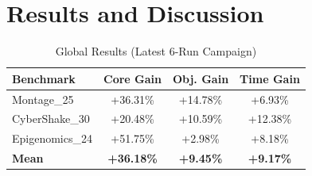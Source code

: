 \documentclass[conference]{IEEEtran}
\begin{document}
\section{Results and Discussion}
\begin{table}[htbp]
\centering
\caption{Global Results (Latest 6-Run Campaign)}
\label{tab:global_results}
\begin{tabular}{lccc}
\toprule
\textbf{Benchmark} & \textbf{Core Gain} & \textbf{Obj. Gain} & \textbf{Time Gain} \\
\midrule
Montage\_25 & +36.31\% & +14.78\% & +6.93\% \\
CyberShake\_30 & +20.48\% & +10.59\% & +12.38\% \\
Epigenomics\_24 & +51.75\% & +2.98\% & +8.18\% \\
\midrule
\textbf{Mean} & \textbf{+36.18\%} & \textbf{+9.45\%} & \textbf{+9.17\%} \\
\bottomrule
\end{tabular}
\end{table}
\end{document}
